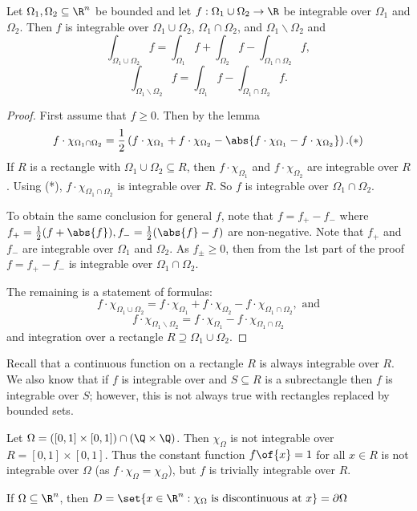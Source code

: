 \begin{theorem}
    Let $\Omega_1, \Omega_2 \subseteq \R^n$ be bounded and let $f: \Omega_1 \cup \Omega_2 \to \R$ be integrable over $\Omega_1$ and $\Omega_2$. Then $f$ is integrable over $\Omega_1 \cup \Omega_2$, $\Omega_1 \cap \Omega_2$, and $\Omega_1 \backslash \Omega_2$ and
    \[\int_{\Omega_1 \cup \Omega_2} f = \int_{\Omega_1} f + \int_{\Omega_2} f - \int_{\Omega_1 \cap \Omega_2} f,\]
    \[\int_{\Omega_1 \backslash \Omega_2} f = \int_{\Omega_1} f - \int_{\Omega_1 \cap \Omega_2} f.\]
\end{theorem}
\begin{proof}
    First assume that $f \geq 0$. Then by the lemma \[f \cdot \chi_{\Omega_1 \cap \Omega_2} = \frac{1}{2} \left(f \cdot \chi_{\Omega_1} + f \cdot \chi_{\Omega_2} - \abs{f \cdot \chi_{\Omega_1} - f \cdot \chi_{\Omega_2}}\right). (*)\]
    If $R$ is a rectangle with $\Omega_1 \cup \Omega_2 \subseteq R$, then $f \cdot \chi_{\Omega_1}$ and $f \cdot \chi_{\Omega_2}$ are integrable over $R$. Using (*), $f \cdot \chi_{\Omega_1 \cap \Omega_2}$ is integrable over $R$. So $f$ is integrable over $\Omega_1 \cap \Omega_2$.

    To obtain the same conclusion for general $f$, note that $f = f_+ - f_-$ where $f_+ = \frac{1}{2}(f + \abs{f}), f_- = \frac{1}{2}(\abs{f} - f)$ are non-negative. Note that $f_+$ and $f_-$ are integrable over $\Omega_1$ and $\Omega_2$. As $f_{\pm} \geq 0$, then from the 1st part of the proof $f = f_+ - f_-$ is integrable over $\Omega_1 \cap \Omega_2$.

    The remaining is a statement of formulas:
    \[f \cdot \chi_{\Omega_1 \cup \Omega_2} = f \cdot \chi_{\Omega_1} + f \cdot \chi_{\Omega_2} - f \cdot \chi_{\Omega_1 \cap \Omega_2}, \text{ and}\]
    \[f \cdot \chi_{\Omega_1 \backslash \Omega_2} = f \cdot \chi_{\Omega_1} - f \cdot \chi_{\Omega_1 \cap \Omega_2}\]
    and integration over a rectangle $R \supseteq \Omega_1 \cup \Omega_2$.
\end{proof}

Recall that a continuous function on a rectangle $R$ is always integrable over $R$. We also know that if $f$ is integrable over and $S \subseteq R$ is a subrectangle then $f$ is integrable over $S$; however, this is not always true with rectangles replaced by bounded sets.

\begin{example}
    Let $\Omega = ([0,1] \times [0,1]) \cap (\Q \times \Q)$. Then $\chi_\Omega$ is not integrable over $R = [0,1] \times [0,1]$. Thus the constant function $f\of{x} = 1$ for all $x \in R$ is not integrable over $\Omega$ (as $f \cdot \chi_\Omega = \chi_\Omega$), but $f$ is trivially integrable over $R$.
\end{example}

\begin{lemma}
    If $\Omega \subseteq \R^n$, then $D = \set{x \in \R^n: \chi_\Omega \text{ is discontinuous at } x} = \partial\Omega$
\end{lemma}

